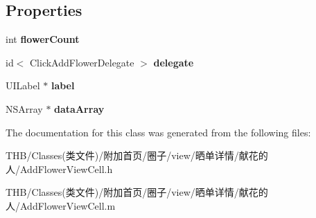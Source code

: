 \subsection*{Properties}
\begin{DoxyCompactItemize}
\item 
\mbox{\label{interface_add_flower_view_cell_ae3102b05d51d03e9b650c61c34e38290}} 
int {\bfseries flower\+Count}
\item 
\mbox{\label{interface_add_flower_view_cell_a16ef1be9ea150ac4a3fd2c3a65259ceb}} 
id$<$ Click\+Add\+Flower\+Delegate $>$ {\bfseries delegate}
\item 
\mbox{\label{interface_add_flower_view_cell_aed694f3cc56b6a9f7c31a84dff7bb689}} 
U\+I\+Label $\ast$ {\bfseries label}
\item 
\mbox{\label{interface_add_flower_view_cell_aa5922243510167596d945c455fb026be}} 
N\+S\+Array $\ast$ {\bfseries data\+Array}
\end{DoxyCompactItemize}


The documentation for this class was generated from the following files\+:\begin{DoxyCompactItemize}
\item 
T\+H\+B/\+Classes(类文件)/附加首页/圈子/view/晒单详情/献花的人/Add\+Flower\+View\+Cell.\+h\item 
T\+H\+B/\+Classes(类文件)/附加首页/圈子/view/晒单详情/献花的人/Add\+Flower\+View\+Cell.\+m\end{DoxyCompactItemize}
